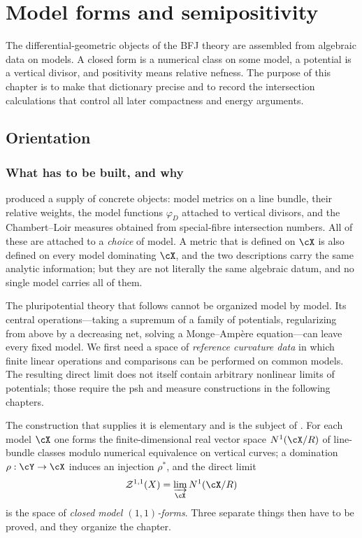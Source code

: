 \chapter{Model forms and semipositivity}
\label{chap:bfj-model-forms}

The differential-geometric objects of the BFJ theory are assembled from
algebraic data on models.  A closed form is a numerical class on some model,
a potential is a vertical divisor, and positivity means relative nefness.
The purpose of this chapter is to make that dictionary precise and to record
the intersection calculations that control all later compactness and energy
arguments.

\section{Orientation}
\label{sec:ch20-orientation}

\subsection{What has to be built, and why}
\label{sec:ch20-why}

 produced a supply of concrete objects: model metrics on a
line bundle, their relative weights, the model functions
$\varphi_D$ attached to vertical divisors, and the Chambert--Loir measures
obtained from special-fibre intersection numbers.  All of these are attached
to a \emph{choice} of model.  A metric that is defined on $\cX$ is also
defined on every model dominating $\cX$, and the two descriptions carry the
same analytic information; but they are not literally the same algebraic
datum, and no single model carries all of them.

The pluripotential theory that follows cannot be organized model by model.
Its central operations---taking a supremum of a family of potentials,
regularizing from above by a decreasing net, solving a Monge--Amp\`ere
equation---can leave every fixed model.  We first need a space of
\emph{reference curvature data} in which finite linear operations and
comparisons can be performed on common models.  The resulting direct limit
does not itself contain arbitrary nonlinear limits of potentials; those
require the psh and measure constructions in the following chapters.

The construction that supplies it is elementary and is the subject of
.  For each model $\cX$ one
forms the finite-dimensional real vector space $N^1(\cX/R)$ of line-bundle
classes modulo numerical equivalence on vertical curves; a domination
$\rho:\cY\to\cX$ induces an injection $\rho^*$, and the direct limit
\[
 \mathcal Z^{1,1}(X)=\varinjlim_{\cX}N^1(\cX/R)
\]
is the space of \emph{closed model $(1,1)$-forms}.  Three separate things
then have to be proved, and they organize the chapter.

